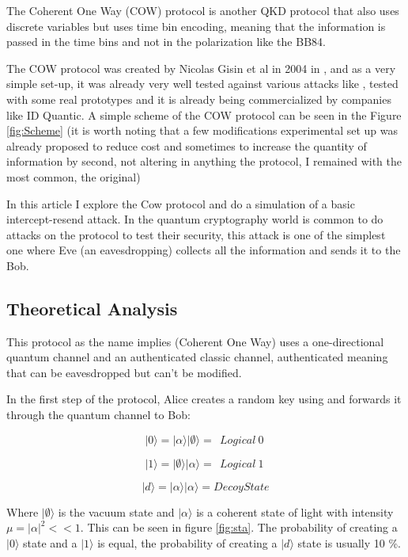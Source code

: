 \begin{refsection}
The Coherent One Way (COW) protocol is another QKD protocol that also uses discrete variables but uses time bin encoding, meaning that the information is passed in the time bins and not in the polarization like the BB84.

The COW protocol was created by Nicolas Gisin et al in 2004 in \cite{gisin2004towards}, and as a very simple set-up, it was already very well tested against various attacks like \cite{branciard2006zero}, tested with some real prototypes \cite{stucki2009continuous} and it is already being commercialized by companies like ID Quantic. A simple scheme of the COW protocol can be seen in the Figure \ref{fig:Scheme} (it is worth noting that a few modifications experimental set up was already proposed \cite{roberts2017modulator} to reduce cost and sometimes to increase the quantity of information by second, not altering in anything the protocol, I remained with the most common, the original)

In this article I explore the Cow protocol and do a simulation of a basic intercept-resend attack. In the quantum cryptography world is common to do attacks on the protocol to test their security, this attack is one of the simplest one where Eve (an eavesdropping) collects all the information and sends it to the Bob.

\subsection{Theoretical Analysis}

This protocol as the name implies (Coherent One Way) uses a one-directional quantum channel and an authenticated classic channel, authenticated meaning that can be eavesdropped but can't be modified.

In the first step of the protocol, Alice creates a random key using and forwards it through the quantum channel to Bob:

$$|0\rangle = |\alpha\rangle |\emptyset\rangle =\ \ Logical\ 0\ $$

$$|1\rangle = |\emptyset\rangle |\alpha\rangle =\ \ Logical\ 1\ $$

$$|d\rangle = |\alpha\rangle |\alpha\rangle = Decoy State$$

Where $|\emptyset\rangle$ is the vacuum state and $|\alpha\rangle$ is a coherent state of light with intensity $\mu=|\alpha|^2<<1$. This can be seen in figure \ref{fig:sta}.
The probability of creating a $|0\rangle$ state and a $|1\rangle$ is equal, the probability of creating a $|d\rangle$ state is usually 10 \%.


\end{refsection}
